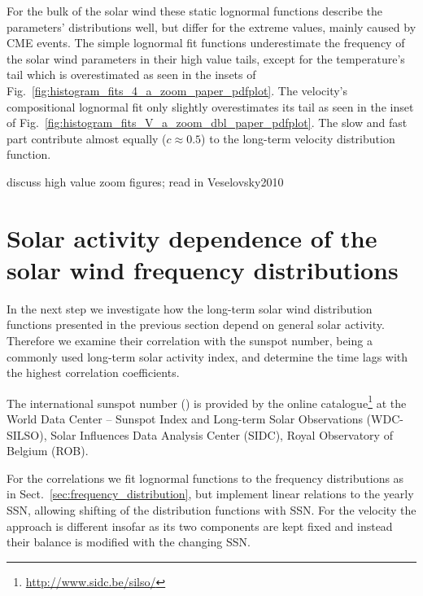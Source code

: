 For the bulk of the solar wind these static lognormal functions describe the parameters' distributions well, but differ for the extreme values, mainly caused by CME events.
The simple lognormal fit functions underestimate the frequency of the solar wind parameters in their high value tails, except for the temperature’s tail which is overestimated as seen in the insets of Fig.~\ref{fig:histogram_fits_4_a_zoom_paper_pdfplot}. The velocity's compositional lognormal fit only slightly overestimates its tail as seen in the inset of Fig.~\ref{fig:histogram_fits_V_a_zoom_dbl_paper_pdfplot}.
The slow and fast part contribute almost equally ($c \approx 0.5$) to the long-term velocity distribution function.

{\color{red} discuss high value zoom figures; read in Veselovsky2010}


\section{Solar activity dependence of the solar wind frequency distributions}
\label{sec:solar_activity_variations}
In the next step we investigate how the long-term solar wind distribution functions presented in the previous section depend on general solar activity. Therefore we examine their correlation with the sunspot number, being a commonly used long-term solar activity index, and determine the time lags with the highest correlation coefficients.

The international sunspot number (\citeyear{sidc}) is provided by the online catalogue\footnote{\url{http://www.sidc.be/silso/}} at the World Data Center -- Sunspot Index and Long-term Solar Observations (WDC-SILSO), Solar Influences Data Analysis Center (SIDC), Royal Observatory of Belgium (ROB).

For the correlations we fit lognormal functions to the frequency distributions as in Sect.~\ref{sec:frequency_distribution}, but implement linear relations to the yearly SSN, allowing shifting of the distribution functions with SSN. For the velocity the approach is different insofar as its two components are kept fixed and instead their balance is modified with the changing SSN.

